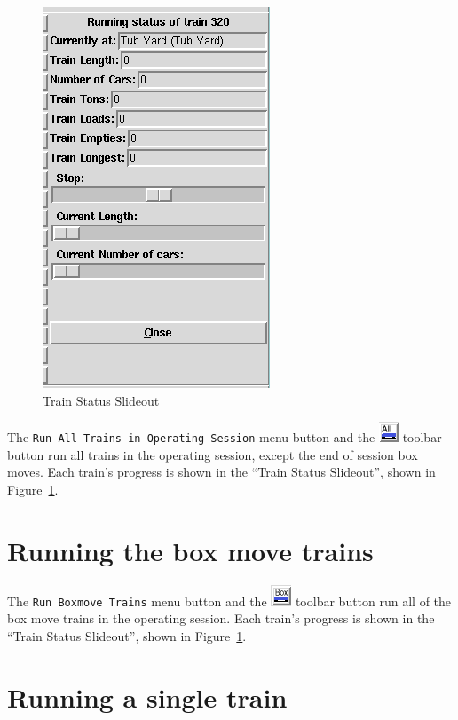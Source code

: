 \begin{figure}[hbpt]
\begin{centering}
\includegraphics{FCFTrainStatusSlideout.png}
\caption{Train Status Slideout}
\label{fig:fcf:trainstatusslideout}
\end{centering}
\end{figure}
The \verb=Run All Trains in Operating Session= menu button and the
\includegraphics{FCFRunAllTrTool.png} toolbar button run all trains in
the operating session, except the end of session box moves.  Each
train's progress is shown in the ``Train Status Slideout'', shown in
Figure~\ref{fig:fcf:trainstatusslideout}.

\section{Running the box move trains}

The \verb=Run Boxmove Trains= menu button and the
\includegraphics{FCFRunBTrTool.png} toolbar button run all of the box
move trains in the operating session.  Each train's progress is shown
in the ``Train Status Slideout'', shown in
Figure~\ref{fig:fcf:trainstatusslideout}.

\section{Running a single train}

